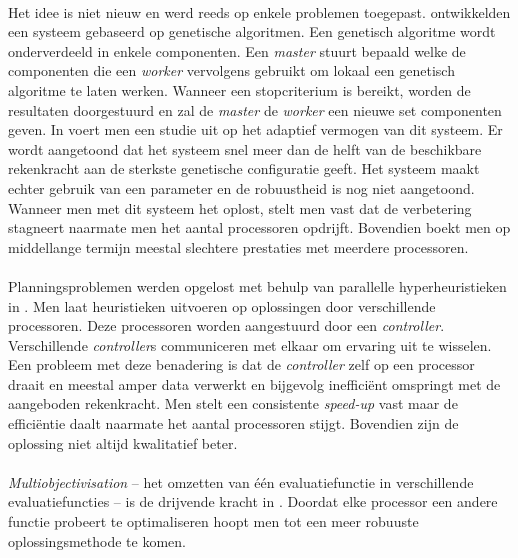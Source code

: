 \paragraph{}
Het idee is niet nieuw en werd reeds op enkele problemen toegepast. \cite{conf/gecco/LeonMS08,conf/pdp/SeguraSL12} ontwikkelden een systeem gebaseerd op genetische algoritmen. Een genetisch algoritme wordt onderverdeeld in enkele componenten. Een \emph{master} stuurt bepaald welke de componenten die een \emph{worker} vervolgens gebruikt om lokaal een genetisch algoritme te laten werken. Wanneer een stopcriterium is bereikt, worden de resultaten doorgestuurd en zal de \emph{master} de \emph{worker} een nieuwe set componenten geven. In \cite{conf/pdp/SeguraSL12} voert men een studie uit op het adaptief vermogen van dit systeem. Er wordt aangetoond dat het systeem snel meer dan de helft van de beschikbare rekenkracht aan de sterkste genetische configuratie geeft. Het systeem maakt echter gebruik van een parameter en de robuustheid is nog niet aangetoond. Wanneer men met dit systeem het  oplost, stelt men vast dat de verbetering stagneert naarmate men het aantal processoren opdrijft. Bovendien boekt men op middellange termijn meestal slechtere prestaties met meerdere processoren.

\paragraph{}
Planningsproblemen werden opgelost met behulp van parallelle hyperheuristieken in \cite{Rattadilok04adistributed}. Men laat heuristieken uitvoeren op oplossingen door verschillende processoren. Deze processoren worden aangestuurd door een \emph{controller}. Verschillende \emph{controller}s communiceren met elkaar om ervaring uit te wisselen. Een probleem met deze benadering is dat de \emph{controller} zelf op een processor draait en meestal amper data verwerkt en bijgevolg ineffici\"ent omspringt met de aangeboden rekenkracht. Men stelt een consistente \emph{speed-up} vast maar de effici\"entie daalt naarmate het aantal processoren stijgt. Bovendien zijn de oplossing niet altijd kwalitatief beter.

\paragraph{}
\emph{Multiobjectivisation} -- het omzetten van \'e\'en evaluatiefunctie in verschillende evaluatiefuncties -- is de drijvende kracht in \cite{Luna08usinga}. Doordat elke processor een andere functie probeert te optimaliseren hoopt men tot een meer robuuste oplossingsmethode te komen.